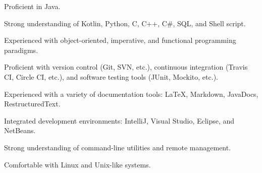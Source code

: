 
\begin{cvskills}
    {
      \begin{cvitems}
        \item {Proficient in Java.}
        \item {Strong understanding of Kotlin, Python, C, C++, C\#, SQL, and Shell script.}
        \item {Experienced with object-oriented, imperative, and functional programming paradigms.}
      \end{cvitems}
    }

  {
    \begin{cvitems}
      \item {Proficient with version control (Git, SVN, etc.), continuous integration (Travis CI, Circle CI, etc.), and software testing tools (JUnit, Mockito, etc.).}
      \item {Experienced with a variety of documentation tools: LaTeX, Markdown, JavaDocs, RestructuredText.}
    \end{cvitems}
  }

    {
      \begin{cvitems}
        \item {Integrated development environments: IntelliJ, Visual Studio, Eclipse, and NetBeans.}
        \item {Strong understanding of command-line utilities and remote management.}
        \item {Comfortable with Linux and Unix-like systems.}
      \end{cvitems}
    }

\end{cvskills}
